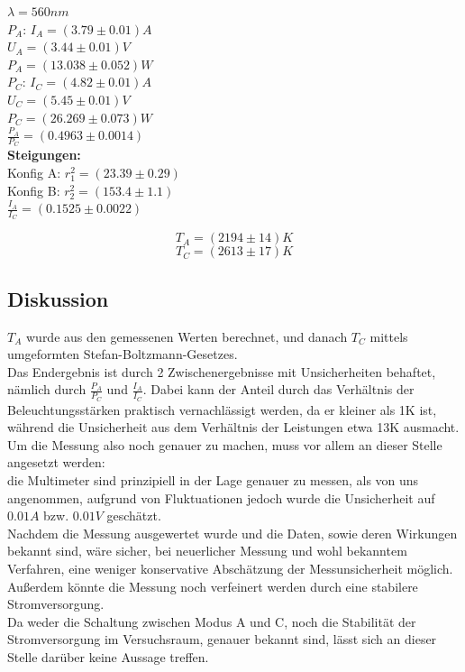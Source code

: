 \documentclass[12pt,a4paper]{article}
\begin{document}
\begin{multicols}{2}

\noindent $\lambda = 560 nm$\\
$P_A$: $I_A=(3.79\pm 0.01)A$\\
\indent $U_A=(3.44\pm 0.01)V$\\
$P_A=(13.038 \pm 0.052)W$\\

\noindent $P_C$: $I_C=(4.82\pm0.01)A$\\
\indent $U_C=(5.45 \pm 0.01)V$\\
$P_C=(26.269 \pm 0.073)W$\\

\noindent $\frac{P_A}{P_C}=(0.4963 \pm 0.0014)$\\

\noindent \textbf{Steigungen:}\\
Konfig A: $r_1^2=(23.39 \pm 0.29)$\\
Konfig B: $r_2^2=(153.4 \pm 1.1)$\\

$\frac{I_A}{I_C}= ( 0.1525 \pm 0.0022)$

$$T_A= (2194\pm 14)K$$
$$T_C=(2613 \pm 17)K$$

\subsection{Diskussion}

$T_A$ wurde aus den gemessenen Werten berechnet, und danach $T_C$ mittels umgeformten Stefan-Boltzmann-Gesetzes.\\
Das Endergebnis ist durch 2 Zwischenergebnisse mit Unsicherheiten behaftet, nämlich durch $\frac{P_A}{P_C}$ und $\frac{I_A}{I_C}$. Dabei kann der Anteil durch das Verhältnis der Beleuchtungsstärken praktisch vernachlässigt werden, da er kleiner als 1K ist, während die Unsicherheit aus dem Verhältnis der Leistungen etwa 13K ausmacht.\\
Um die Messung also noch genauer zu machen, muss vor allem an dieser Stelle angesetzt werden:\\
die Multimeter sind prinzipiell in der Lage genauer zu messen, als von uns angenommen, aufgrund von Fluktuationen jedoch wurde die Unsicherheit auf $0.01A$ bzw. $0.01V$ geschätzt.\\
Nachdem die Messung ausgewertet wurde und die Daten, sowie deren Wirkungen bekannt sind, wäre sicher, bei neuerlicher Messung und wohl bekanntem Verfahren, eine weniger konservative Abschätzung der Messunsicherheit möglich.\\
Außerdem könnte die Messung noch verfeinert werden durch eine stabilere Stromversorgung.\\
Da weder die Schaltung zwischen Modus A und C, noch die Stabilität der Stromversorgung im Versuchsraum, genauer bekannt sind, lässt sich an dieser Stelle darüber keine Aussage treffen.\\


\end{multicols}
\end{document}
